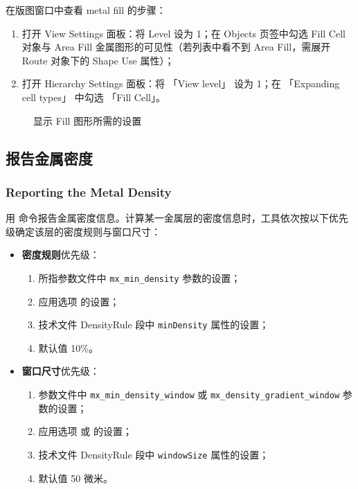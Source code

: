 在版图窗口中查看 metal fill 的步骤：
\begin{enumerate}
  \item 打开 View Settings 面板：将 Level 设为 1；在 Objects 页签中勾选 Fill Cell 对象与 Area Fill 金属图形的可见性（若列表中看不到 Area Fill，需展开 Route 对象下的 Shape Use 属性）；
  \item 打开 Hierarchy Settings 面板：将 「View level」 设为 1；在 「Expanding cell types」 中勾选 「Fill Cell」。
\end{enumerate}

\begin{figure}[htbp]
\centering
{}
\caption{显示 Fill 图形所需的设置}
\label{fig:fill-display-settings}
\end{figure}

\subsection{报告金属密度}
\subsubsection*{Reporting the Metal Density}

用  命令报告金属密度信息。计算某一金属层的密度信息时，工具依次按以下优先级确定该层的密度规则与窗口尺寸：

\begin{itemize}
  \item \textbf{密度规则}优先级：
        \begin{enumerate}
          \item {} 所指参数文件中 \texttt{mx\_min\_density} 参数的设置；
          \item 应用选项  的设置；
          \item 技术文件 DensityRule 段中 \texttt{minDensity} 属性的设置；
          \item 默认值 10\%。
        \end{enumerate}
  \item \textbf{窗口尺寸}优先级：
        \begin{enumerate}
          \item 参数文件中 \texttt{mx\_min\_density\_window} 或 \texttt{mx\_density\_gradient\_window} 参数的设置；
          \item 应用选项  或  的设置；
          \item 技术文件 DensityRule 段中 \texttt{windowSize} 属性的设置；
          \item 默认值 50 微米。
        \end{enumerate}
\end{itemize}

